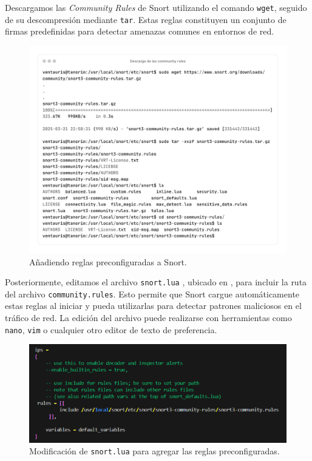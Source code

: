 \documentclass[11pt,a4paper,twoside]{report}
\begin{document}
\vspace{-1.5em}

Descargamos las \textit{Community Rules} de Snort utilizando el comando \texttt{wget}, seguido de su descompresión mediante \texttt{tar}. Estas reglas constituyen un conjunto de firmas predefinidas para detectar amenazas comunes en entornos de red.
\vspace{-1.5em}
\begin{figure}[H]
	\centering
	\includegraphics[scale=0.12]{instalacion_reglas_snort/1-1.png}
	\caption{Añadiendo reglas preconfiguradas a Snort.}
\end{figure}

\pagebreak

Posteriormente, editamos el archivo \texttt{snort.lua} \cite{snort_user_manual}, ubicado en , para incluir la ruta del archivo \texttt{community.rules}. Esto permite que Snort cargue automáticamente estas reglas al iniciar y pueda utilizarlas para detectar patrones maliciosos en el tráfico de red. La edición del archivo puede realizarse con herramientas como \texttt{nano}, \texttt{vim} o cualquier otro editor de texto de preferencia.

\begin{figure}[H]
	\centering
	\includegraphics[scale=0.8]{instalacion_reglas_snort/2.png}
	\caption{Modificación de \texttt{snort.lua} para agregar las reglas preconfiguradas.}
\end{figure}
\end{document}
